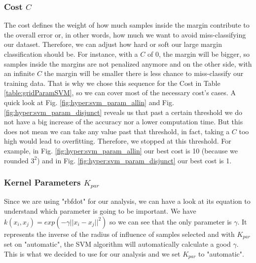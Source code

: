 \documentclass[conference]{IEEEtran}
\begin{document}
{    \subsubsection{Cost $C$}
    The cost defines the weight of how much samples inside the margin contribute to the overall error or, in other words, how much we want to avoid miss-classifying our dataset. Therefore, we can adjust how hard or soft our large margin classification should be.
    For instance, with a $C$ of 0, the margin will be bigger, so samples inside the margins are not penalized anymore and on the other side, with an infinite $C$ the margin will be smaller there is less chance to miss-classify our training data. That is why we chose this sequence for the Cost in Table \ref{table:gridParamSVM}, so we can cover most of the necessary cost's cases.
    A quick look at Fig. \ref{fig:hyper:svm_param_allin} and Fig. \ref{fig:hyper:svm_param_disjunct} reveals us that past a certain threshold we do not have a big increase of the accuracy nor a lower computation time. But this does not mean we can take any value past that threshold, in fact, taking a $C$ too high would lead to overfitting. Therefore, we stopped at this threshold. For example, in Fig. \ref{fig:hyper:svm_param_allin} our best cost is 10 (because we rounded $3^2$) and in Fig. \ref{fig:hyper:svm_param_disjunct} our best cost is 1.
    \subsubsection{Kernel Parameters $K_{par}$}
    Since we are using "rbfdot" for our analysis, we can have a look at its equation to understand which parameter is going to be important. We have \(k(x_{i},x_{j})=exp(-\gamma||x_{i}-x_{j}||^{2})\) so we can see that the only parameter is $\gamma$. It represents the inverse of the radius of influence of samples selected and with $K_{par}$ set on "automatic", the SVM algorithm will automatically calculate a good $\gamma$. This is what we decided to use for our analysis and we set $K_{par}$ to "automatic".}
\end{document}

